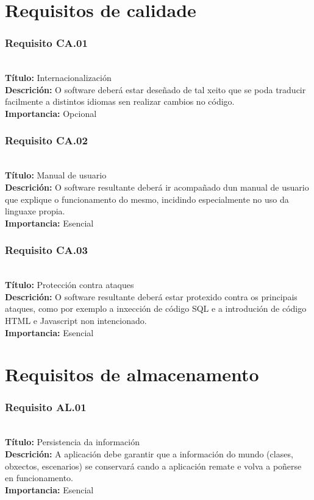 \section{Requisitos de calidade}
\subsubsection{Requisito CA.01}~\\
{\bf Título:} Internacionalización\\
{\bf Descrición:} O software deberá estar deseñado de tal xeito que se poda
traducir facilmente a distintos idiomas sen realizar cambios no código.\\
{\bf Importancia:} Opcional

\subsubsection{Requisito CA.02}~\\
{\bf Título:} Manual de usuario\\
{\bf Descrición:} O software resultante deberá ir acompañado dun manual de
usuario que explique o funcionamento do mesmo, incidindo especialmente no uso
da linguaxe propia.\\
{\bf Importancia:} Esencial

\subsubsection{Requisito CA.03}~\\
{\bf Título:} Protección contra ataques\\
{\bf Descrición:} O software resultante deberá estar protexido contra os
principais ataques, como por exemplo a inxección de código SQL e a introdución
de código HTML e Javascript non intencionado.\\
{\bf Importancia:} Esencial

\section{Requisitos de almacenamento}
\subsubsection{Requisito AL.01}~\\
{\bf Título:} Persistencia da información\\
{\bf Descrición:} A aplicación debe garantir que a información do mundo
(clases, obxectos, escenarios) se conservará cando a aplicación remate e volva a
poñerse en funcionamento.\\
{\bf Importancia:} Esencial
